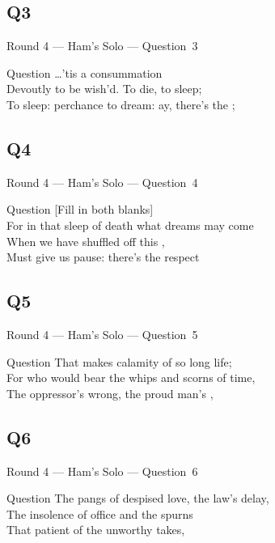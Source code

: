 \documentclass[11pt]{beamer}
\begin{document}
\subsection*{Q3}
\begin{frame}[t]{Round 4 --- Ham's Solo --- \mbox{Question 3}}
\vspace{-0.5em}
\begin{block}{Question}
\ldots{}'tis a consummation\\
Devoutly to be wish'd. To die, to sleep;\\
To sleep: perchance to dream: ay, there's the \textunderscore{}\textunderscore{}\textunderscore{}\textunderscore{}\textunderscore{};
\end{block}
\end{frame}
\subsection*{Q4}
\begin{frame}[t]{Round 4 --- Ham's Solo --- \mbox{Question 4}}
\vspace{-0.5em}
\begin{block}{Question}
[Fill in both blanks]\\
For in that sleep of death what dreams may come\\
When we have shuffled off this \textunderscore{}\textunderscore{}\textunderscore{}\textunderscore{}\textunderscore{} \textunderscore{}\textunderscore{}\textunderscore{}\textunderscore{}\textunderscore{},\\
Must give us pause: there's the respect
\end{block}
\end{frame}
\subsection*{Q5}
\begin{frame}[t]{Round 4 --- Ham's Solo --- \mbox{Question 5}}
\vspace{-0.5em}
\begin{block}{Question}
That makes calamity of so long life;\\
For who would bear the whips and scorns of time,\\
The oppressor's wrong, the proud man's \textunderscore{}\textunderscore{}\textunderscore{}\textunderscore{}\textunderscore{},
\end{block}
\end{frame}
\subsection*{Q6}
\begin{frame}[t]{Round 4 --- Ham's Solo --- \mbox{Question 6}}
\vspace{-0.5em}
\begin{block}{Question}
The pangs of despised love, the law's delay,\\
The insolence of office and the spurns\\
That patient \textunderscore{}\textunderscore{}\textunderscore{}\textunderscore{}\textunderscore{} of the unworthy takes,
\end{block}
\end{frame}
\end{document}
